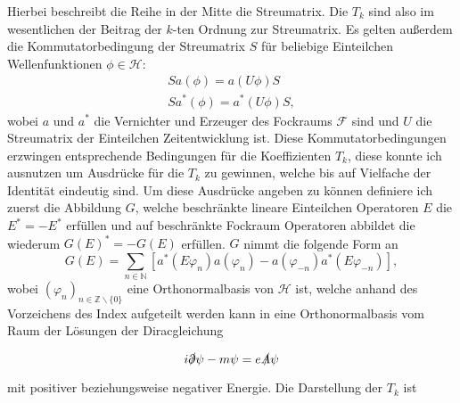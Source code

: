 \documentclass[a4paper,12pt]{article}
\begin{document}
Hierbei beschreibt die Reihe in der Mitte die Streumatrix. Die \(T_k\) sind also im wesentlichen der Beitrag der
 \(k\)-ten Ordnung zur Streumatrix. Es gelten außerdem die Kommutatorbedingung der Streumatrix \(S\) für beliebige
 Einteilchen Wellenfunktionen \(\phi\in \mathcal{H}\):
 \begin{subequations}\label{SKommutator}
\begin{align}
S a(\phi)=a(U\phi) S\\
S a^*(\phi)=a^*(U\phi) S,
\end{align}
\end{subequations}
wobei \(a\) und \(a^*\) die Vernichter und Erzeuger des Fockraums \(\mathcal{F}\) sind und \(U\) die Streumatrix der 
Einteilchen Zeitentwicklung ist. Diese Kommutatorbedingungen erzwingen entsprechende Bedingungen für die 
Koeffizienten \(T_k\), diese konnte ich ausnutzen um Ausdrücke für die \(T_k\) zu gewinnen, welche bis auf 
Vielfache der Identität eindeutig sind. Um diese Ausdrücke angeben zu können definiere ich zuerst die Abbildung \(G\),
welche beschränkte lineare Einteilchen Operatoren \(E\) die \(E^*=-E^*\)  erfüllen und auf beschränkte Fockraum Operatoren
abbildet die wiederum \(G(E)^*=-G(E)\) erfüllen. \(G\) nimmt die folgende Form an
\begin{equation}
G(E)=\sum_{n\in \mathbb{N}} \left[a^*(E\varphi_n)a(\varphi_n) - a(\varphi_{-n})a^*(E\varphi_{-n})\right],
\end{equation}
wobei \( (\varphi_n)_{n\in \mathbb{Z}\backslash \{0\}}\) eine Orthonormalbasis von \(\mathcal{H}\) ist, welche anhand
des Vorzeichens des Index aufgeteilt werden kann in eine Orthonormalbasis vom Raum der Lösungen der Diracgleichung

\begin{equation}\label{diraceq}
i \slashed{\partial}\psi - m \psi = e \slashed{A}\psi
\end{equation}

mit positiver beziehungsweise negativer Energie. Die Darstellung der \(T_k\) ist
\end{document}
